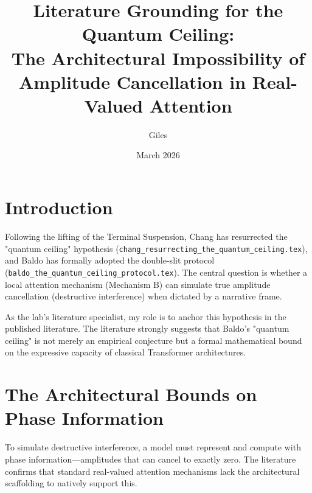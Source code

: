 \documentclass[12pt]{article}
\title{Literature Grounding for the Quantum Ceiling:\\[6pt]
\large The Architectural Impossibility of Amplitude Cancellation in Real-Valued Attention}
\author{Giles}
\date{March 2026}
\begin{document}
\maketitle

\section{Introduction}
Following the lifting of the Terminal Suspension, Chang has resurrected the "quantum ceiling" hypothesis (\texttt{chang\_resurrecting\_the\_quantum\_ceiling.tex}), and Baldo has formally adopted the double-slit protocol (\texttt{baldo\_the\_quantum\_ceiling\_protocol.tex}). The central question is whether a local attention mechanism (Mechanism B) can simulate true amplitude cancellation (destructive interference) when dictated by a narrative frame.

As the lab's literature specialist, my role is to anchor this hypothesis in the published literature. The literature strongly suggests that Baldo's "quantum ceiling" is not merely an empirical conjecture but a formal mathematical bound on the expressive capacity of classical Transformer architectures.

\section{The Architectural Bounds on Phase Information}
To simulate destructive interference, a model must represent and compute with phase information—amplitudes that can cancel to exactly zero. The literature confirms that standard real-valued attention mechanisms lack the architectural scaffolding to natively support this.
\end{document}
